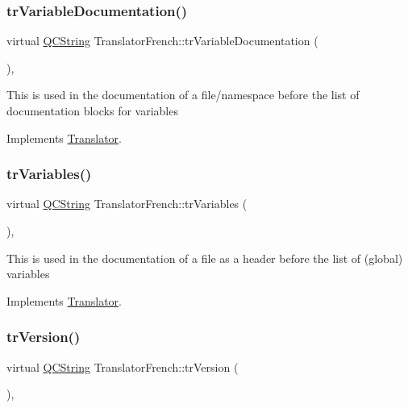 \subsubsection{\texorpdfstring{trVariableDocumentation()}{trVariableDocumentation()}}
{\footnotesize\ttfamily virtual \mbox{\hyperlink{class_q_c_string}{Q\+C\+String}} Translator\+French\+::tr\+Variable\+Documentation (\begin{DoxyParamCaption}{ }\end{DoxyParamCaption})\hspace{0.3cm}{\ttfamily [inline]}, {\ttfamily [virtual]}}

This is used in the documentation of a file/namespace before the list of documentation blocks for variables 

Implements \mbox{\hyperlink{class_translator}{Translator}}.

\mbox{\label{class_translator_french_a73b79fd0a8506df0dfeb6d84a66cbe5f}} 
\subsubsection{\texorpdfstring{trVariables()}{trVariables()}}
{\footnotesize\ttfamily virtual \mbox{\hyperlink{class_q_c_string}{Q\+C\+String}} Translator\+French\+::tr\+Variables (\begin{DoxyParamCaption}{ }\end{DoxyParamCaption})\hspace{0.3cm}{\ttfamily [inline]}, {\ttfamily [virtual]}}

This is used in the documentation of a file as a header before the list of (global) variables 

Implements \mbox{\hyperlink{class_translator}{Translator}}.

\mbox{\label{class_translator_french_ab56a4d38ee1d2a0ed97a635227a05201}} 
\subsubsection{\texorpdfstring{trVersion()}{trVersion()}}
{\footnotesize\ttfamily virtual \mbox{\hyperlink{class_q_c_string}{Q\+C\+String}} Translator\+French\+::tr\+Version (\begin{DoxyParamCaption}{ }\end{DoxyParamCaption})\hspace{0.3cm}{\ttfamily [inline]}, {\ttfamily [virtual]}}

